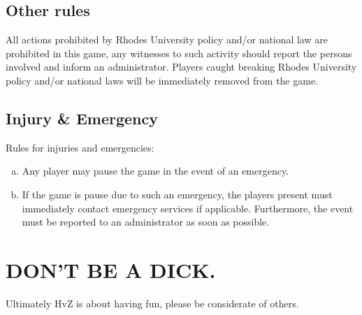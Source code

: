 \documentclass[a4paper,12pt]{article}
\begin{document}
\subsection{Other rules}
All actions prohibited by Rhodes University policy and/or national law are prohibited in this game, any witnesses to such activity should report the persons involved and inform an administrator. Players caught breaking Rhodes University policy and/or national laws will be immediately removed from the game. 

\subsection{Injury \& Emergency}

Rules for injuries and emergencies:
\begin{enumerate}[(a)]
    \item Any player may pause the game in the event of an emergency.
    \item If the game is pause due to such an emergency, the players present must immediately contact emergency services if applicable. Furthermore, the event must be reported to an administrator as soon as possible.
\end{enumerate}

\section{DON'T BE A DICK.}
\label{dbad}
Ultimately HvZ is about having fun, please be considerate of others.



\end{document}
